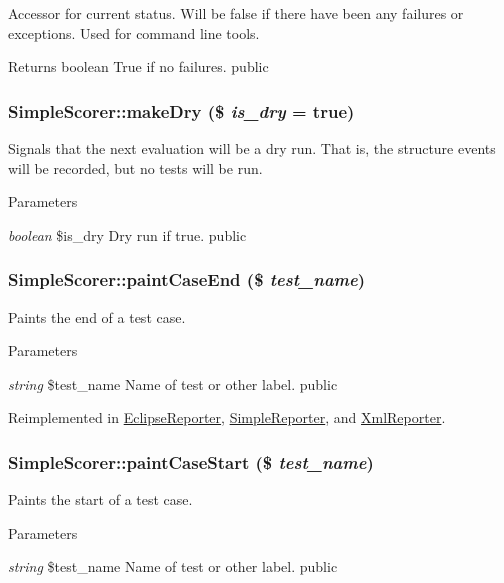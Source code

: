 \label{class_simple_scorer_a0efdf88692ba2649b3f68ab0812781f2}
Accessor for current status. Will be false if there have been any failures or exceptions. Used for command line tools. \begin{DoxyReturn}{Returns}
boolean True if no failures.  public 
\end{DoxyReturn}
\hypertarget{class_simple_scorer_ade2fb6bafe296913437d154817e830ad}{
\subsubsection[{makeDry}]{\setlength{\rightskip}{0pt plus 5cm}SimpleScorer::makeDry (\$ {\em is\_\-dry} = {\ttfamily true})}}
\label{class_simple_scorer_ade2fb6bafe296913437d154817e830ad}
Signals that the next evaluation will be a dry run. That is, the structure events will be recorded, but no tests will be run. 
\begin{DoxyParams}{Parameters}
\item[{\em boolean}]\$is\_\-dry Dry run if true.  public \end{DoxyParams}
\hypertarget{class_simple_scorer_af61cf47c364d7fbe592714776e588e2a}{
\subsubsection[{paintCaseEnd}]{\setlength{\rightskip}{0pt plus 5cm}SimpleScorer::paintCaseEnd (\$ {\em test\_\-name})}}
\label{class_simple_scorer_af61cf47c364d7fbe592714776e588e2a}
Paints the end of a test case. 
\begin{DoxyParams}{Parameters}
\item[{\em string}]\$test\_\-name Name of test or other label.  public \end{DoxyParams}


Reimplemented in \hyperlink{class_eclipse_reporter_a37e47c84707faeb87d1dcf946c1681f6}{EclipseReporter}, \hyperlink{class_simple_reporter_a8e6c0fb28e29920fe42eef652f822753}{SimpleReporter}, and \hyperlink{class_xml_reporter_a1d5e2bab9c6f61d49e65ec55e9a04015}{XmlReporter}.\hypertarget{class_simple_scorer_ae66388eacb1a7ef3f99443a942c8a9b1}{
\subsubsection[{paintCaseStart}]{\setlength{\rightskip}{0pt plus 5cm}SimpleScorer::paintCaseStart (\$ {\em test\_\-name})}}
\label{class_simple_scorer_ae66388eacb1a7ef3f99443a942c8a9b1}
Paints the start of a test case. 
\begin{DoxyParams}{Parameters}
\item[{\em string}]\$test\_\-name Name of test or other label.  public \end{DoxyParams}


